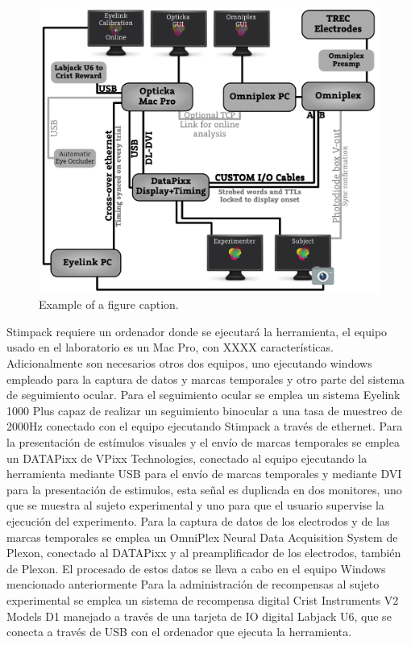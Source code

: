 \documentclass[conference]{IEEEtran}
\begin{document}
\begin{figure}[htbp]
\centerline{\includegraphics[width=\linewidth]{figures/system_diagram.png}}
\caption{Example of a figure caption.}
\label{figSysDiagram}
\end{figure}

Stimpack requiere un ordenador donde se ejecutará la herramienta, el equipo usado en el laboratorio es un Mac Pro, con XXXX características.
Adicionalmente son necesarios otros dos equipos, uno ejecutando windows empleado para la captura de datos y marcas temporales y otro parte del sistema de seguimiento ocular.
Para el seguimiento ocular se emplea un sistema Eyelink 1000 Plus\cite{eyelink} capaz de realizar un seguimiento binocular a una tasa de muestreo de 2000Hz conectado con el equipo ejecutando Stimpack a través de ethernet.
Para la presentación de estímulos visuales y el envío de marcas temporales se emplea un DATAPixx \cite{datapixx} de VPixx Technologies, conectado al equipo ejecutando la herramienta mediante USB para el envío de marcas temporales y mediante DVI para la presentación de estimulos, esta señal es duplicada en dos monitores, uno que se muestra al sujeto experimental y uno para que el usuario supervise la ejecución del experimento.
Para la captura de datos de los electrodos y de las marcas temporales se emplea un OmniPlex Neural Data Acquisition System\cite{omniplex} de Plexon, conectado al DATAPixx y al preamplificador de los electrodos, también de Plexon. El procesado de estos datos se lleva a cabo en el equipo Windows mencionado anteriormente
Para la administración de recompensas al sujeto experimental se emplea un sistema de recompensa digital Crist Instruments V2 Models D1 manejado a través de una  tarjeta de IO digital Labjack U6\cite{labjack}, que se conecta a través de USB con el ordenador que ejecuta la herramienta.
\end{document}

